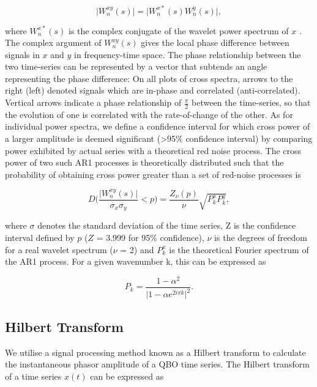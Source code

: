 \begin{equation} \label{wavelet_cross}
\vert W^{xy}_n(s)\vert = \vert W^{x*}_n(s) W^{y}_n(s)\vert,
\end{equation}

where $W^{x*}_n(s)$ is the complex conjugate of the wavelet power spectrum of $x$ \citep{Grinstead2004}. The complex argument of $W^{xy}_n(s)$ gives the local phase difference between signals in $x$ and $y$ in frequency-time space. The phase relationship between the two time-series can be represented by a
vector that subtends an angle representing the phase difference: On all plots of cross spectra, arrows to the right (left) denoted signals which are in-phase and correlated (anti-correlated). Vertical arrows indicate a phase relationship of $\frac{\pi}{2}$ between the time-series, so that the evolution of
one is correlated with the rate-of-change of the other. As for individual power spectra, we define a confidence interval for which cross power of a larger amplitude is deemed significant (>95\% confidence interval) by comparing power exhibited by actual series with a theoretical red noise process. The cross power of two such AR1 processes is theoretically distributed such that the probability of obtaining cross power greater than a set of red-noise processes is

\begin{equation} \label{wavelet_cross_dist}
D\bigg(\frac{\vert W^{xy}_n(s)\vert}{\sigma_x \sigma_y} < p\bigg) = \frac{Z_\nu(p)}{\nu} \sqrt{P^x_k P^y_k},
\end{equation}

where $\sigma$ denotes the standard deviation of the time series, Z is the confidence interval defined by $p$ ($Z$ = 3.999 for 95\% confidence), $\nu$ is the degrees of freedom for a real wavelet spectrum ($\nu$ = 2) and $P^x_k$ is the theoretical Fourier spectrum of the AR1 process. For a given wavenumber k, this can be expressed as

\begin{equation} \label{theoretical_fourier}
P_k = \frac{1 - \alpha^2}{\vert 1 - \alpha e^{2i\pi k} \vert^2}.
\end{equation}

\subsection{Hilbert Transform}
We utilise a signal processing method known as a Hilbert transform to calculate the instantaneous phasor amplitude of a QBO time series. The Hilbert transform of a time series $x(t)$ can be expressed as

